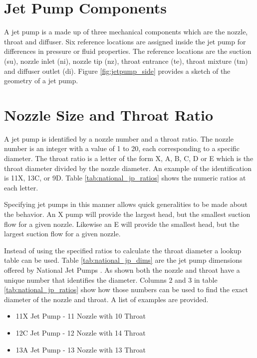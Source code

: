 \documentclass[12 pt]{report}
\begin{document}
\section{Jet Pump Components}

A jet pump is a made up of three mechanical components which are the nozzle, throat and diffuser. Six reference locations are assigned inside the jet pump for differences in pressure or fluid properties. The reference locations are the suction (su), nozzle inlet (ni), nozzle tip (nz), throat entrance (te), throat mixture (tm) and diffuser outlet (di). Figure \ref{fig:jetpump_side} provides a sketch of the geometry of a jet pump. 

\section{Nozzle Size and Throat Ratio}

A jet pump is identified by a nozzle number and a throat ratio. The nozzle number is an integer with a value of 1 to 20, each corresponding to a specific diameter. The throat ratio is a letter of the form X, A, B, C, D or E which is the throat diameter divided by the nozzle diameter. An example of the identification is 11X, 13C, or 9D. Table \ref{tab:national_jp_ratios} shows the numeric ratios at each letter.



Specifying jet pumps in this manner allows quick generalities to be made about the behavior. An X pump will provide the largest head, but the smallest suction flow for a given nozzle. Likewise an E will provide the smallest head, but the largest suction flow for a given nozzle.

Instead of using the specified ratios to calculate the throat diameter a lookup table can be used. Table \ref{tab:national_jp_dims} are the jet pump dimensions offered by National Jet Pumps \cite{world_oil_one}. As shown both the nozzle and throat have a unique number that identifies the diameter. Columns 2 and 3 in table \ref{tab:national_jp_ratios} show how those numbers can be used to find the exact diameter of the nozzle and throat. A list of examples are provided.

\begin{itemize}
    \item 11X Jet Pump - 11 Nozzle with 10 Throat
    \item 12C Jet Pump - 12 Nozzle with 14 Throat
    \item 13A Jet Pump - 13 Nozzle with 13 Throat
\end{itemize}
\end{document}
